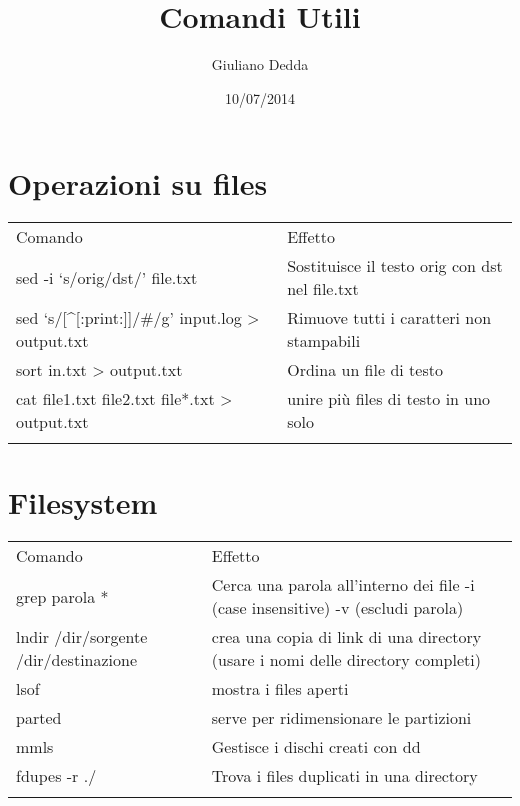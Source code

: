\documentclass[]{article}
\title{Comandi Utili}
\author{Giuliano Dedda}
\date{10/07/2014}
\begin{document}
\maketitle

\section{Operazioni su files}\label{operazioni-su-files}

\begin{longtable}[l]{@{}ll@{}}
\toprule\addlinespace
Comando & Effetto
\\\addlinespace
\midrule\endhead
sed -i `s/orig/dst/' file.txt & Sostituisce il testo orig con dst nel
file.txt
\\\addlinespace
sed `s/{[}\^{}{[}:print:{]}{]}/\#/g' input.log \textgreater{} output.txt
& Rimuove tutti i caratteri non stampabili
\\\addlinespace
sort in.txt \textgreater{} output.txt & Ordina un file di testo
\\\addlinespace
cat file1.txt file2.txt file*.txt \textgreater{} output.txt & unire più
files di testo in uno solo
\\\addlinespace
\bottomrule
\end{longtable}

\section{Filesystem}\label{filesystem}

\begin{longtable}[l]{@{}ll@{}}
\toprule\addlinespace
Comando & Effetto
\\\addlinespace
\midrule\endhead
grep parola * & Cerca una parola all'interno dei file -i (case
insensitive) -v (escludi parola)
\\\addlinespace
lndir /dir/sorgente /dir/destinazione & crea una copia di link di una
directory (usare i nomi delle directory completi)
\\\addlinespace
lsof & mostra i files aperti
\\\addlinespace
parted & serve per ridimensionare le partizioni
\\\addlinespace
mmls & Gestisce i dischi creati con dd
\\\addlinespace
fdupes -r ./ & Trova i files duplicati in una directory
\\\addlinespace
\bottomrule
\end{longtable}
\end{document}
